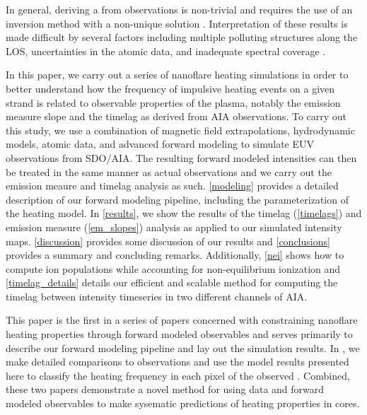 In general, deriving a \dem{} from observations is non-trivial and requires the use of an inversion method with a non-unique solution \citet[see][]{aschwanden_benchmark_2015}. Interpretation of these results is made difficult by several factors including multiple polluting structures along the LOS, uncertainties in the atomic data, and inadequate spectral coverage \citep{winebarger_defining_2012}.


\citet{viall_transition_2015,viall_survey_2017,bradshaw_patterns_2016,lionello_can_2016,winebarger_investigation_2016,winebarger_identifying_2018}


In this paper, we carry out a series of nanoflare heating simulations in order to better understand how the frequency of impulsive heating events on a given strand is related to observable properties of the plasma, notably the emission measure slope and the timelag as derived from AIA observations. To carry out this study, we use a combination of magnetic field extrapolations, hydrodynamic models, atomic data, and advanced forward modeling to simulate EUV observations from SDO/AIA. The resulting forward modeled intensities can then be treated in the same manner as actual observations and we carry out the emission meaure and timelag analysis as such. \autoref{modeling} provides a detailed description of our forward modeling pipeline, including the parameterization of the heating model. In \autoref{results}, we show the results of the timelag (\autoref{timelags}) and emission measure (\autoref{em_slopes}) analysis as applied to our simulated intensity maps. \autoref{discussion} provides some discussion of our results and \autoref{conclusions} provides a summary and concluding remarks. Additionally, \autoref{nei} shows how to compute ion populations while accounting for non-equilibrium ionization and \autoref{timelag_details} details our efficient and scalable method for computing the timelag between intensity timeseries in two different channels of AIA.

This paper is the first in a series of papers concerned with constraining nanoflare heating properties through forward modeled observables and serves primarily to describe our forward modeling pipeline and lay out the simulation results. In , we make detailed comparisons to observations and use the model results presented here to classify the heating frequency in each pixel of the observed \AR{}. Combined, these two papers demonstrate a novel method for using data and forward modeled observables to make sysematic predictions of heating properties in \AR{} cores.
